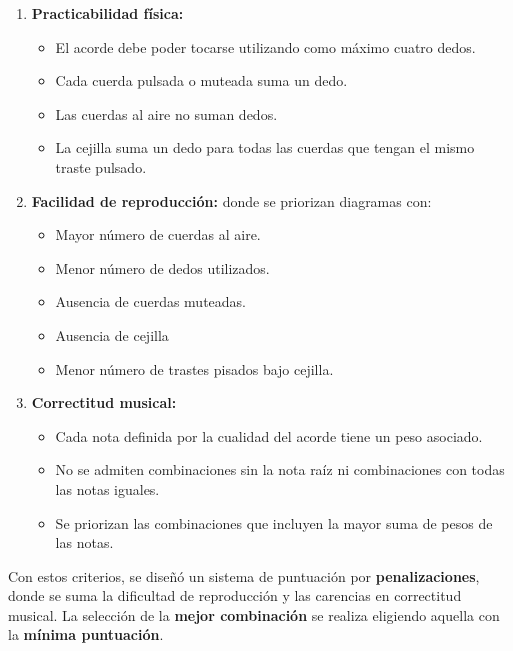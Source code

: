 \begin{enumerate}
    \item \textbf{Practicabilidad física:}
    \begin{itemize}
        \item El acorde debe poder tocarse utilizando como máximo cuatro dedos.
        \item Cada cuerda pulsada o muteada suma un dedo.
        \item Las cuerdas al aire no suman dedos.
        \item La cejilla suma un dedo para todas las cuerdas que tengan el mismo traste pulsado.
    \end{itemize}
    
    \item \textbf{Facilidad de reproducción:} donde se priorizan diagramas con:
    \begin{itemize}
        \item Mayor número de cuerdas al aire.
        \item Menor número de dedos utilizados.
        \item Ausencia de cuerdas muteadas.
        \item Ausencia de cejilla
        \item Menor número de trastes pisados bajo cejilla.
    \end{itemize}

    \item \textbf{Correctitud musical:}
    \begin{itemize}
        \item Cada nota definida por la cualidad del acorde tiene un peso asociado.
        \item No se admiten combinaciones sin la nota raíz ni combinaciones con todas las notas iguales.
        \item Se priorizan las combinaciones que incluyen la mayor suma de pesos de las notas.
    \end{itemize}
\end{enumerate}

Con estos criterios, se diseñó un sistema de puntuación por \textbf{penalizaciones}, donde se suma la dificultad de reproducción y las carencias en correctitud musical. La selección de la \textbf{mejor combinación} se realiza eligiendo aquella con la \textbf{mínima puntuación}.

